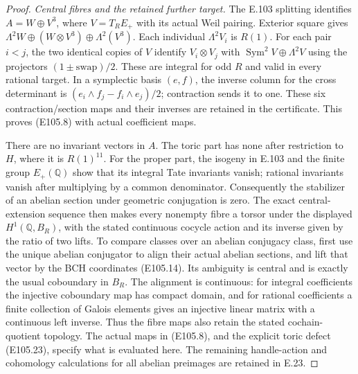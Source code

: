 \begin{proof}
\emph{Central fibres and the retained further target.}
The E.103 splitting identifies $A=W\oplus V^3$,
where $V=T_RE_+$ with its actual Weil pairing.
Exterior square gives $\Lambda^2W\oplus(W\otimes V^3)
\oplus\Lambda^2(V^3)$.
Each individual $\Lambda^2V_i$ is $R(1)$.
For each pair $i<j$, the two identical copies of $V$
identify $V_i\otimes V_j$ with
$\operatorname{Sym}^2V\oplus\Lambda^2V$ using
the projectors $(1\pm\mathrm{swap})/2$.
These are integral for odd $R$ and valid in every
rational target.  In a symplectic basis $(e,f)$,
the inverse column for the cross determinant is
$(e_i\wedge f_j-f_i\wedge e_j)/2$; contraction sends
it to one.  These six contraction/section maps and
their inverses are retained in the certificate.
This proves (E105.8) with actual coefficient maps.

There are no invariant vectors in $A$.
The toric part has none after restriction to $H$,
where it is $R(1)^{11}$.
For the proper part, the isogeny in E.103 and the
finite group $E_+(\mathbb Q)$ show that its integral
Tate invariants vanish; rational invariants vanish
after multiplying by a common denominator.
Consequently the stabilizer of an abelian section
under geometric conjugation is zero.
The exact central-extension sequence then makes
every nonempty fibre a torsor under the displayed
$H^1(\mathbb Q,B_R)$, with the stated continuous
cocycle action and its inverse given by the ratio
of two lifts.  To compare classes over an abelian
conjugacy class, first use the unique abelian conjugator
to align their actual abelian sections, and lift that
vector by the BCH coordinates (E105.14).  Its ambiguity
is central and is exactly the usual coboundary in $B_R$.
The alignment is continuous: for integral coefficients
the injective coboundary map has compact domain, and
for rational coefficients a finite collection of Galois
elements gives an injective linear matrix with a continuous
left inverse.  Thus the fibre maps also retain the stated
cochain-quotient topology.
The actual maps in (E105.8), and the explicit toric
defect (E105.23), specify what is evaluated here.
The remaining handle-action and cohomology calculations
for all abelian preimages are retained in E.23.
\end{proof}
